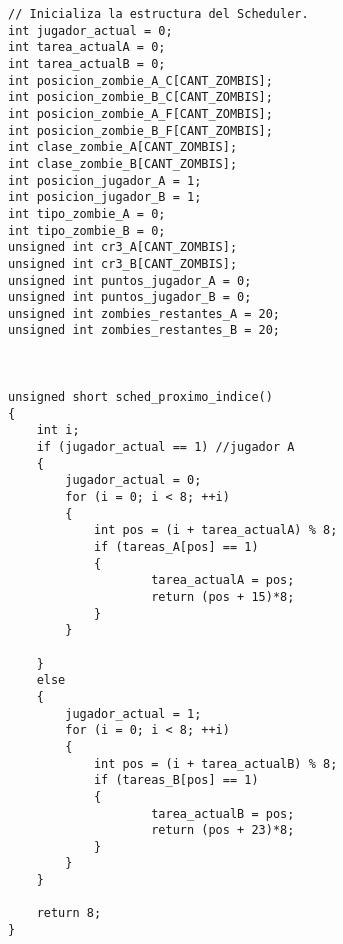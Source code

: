 \documentclass[a4paper]{article}
\begin{document}
\begin{lstlisting}[caption={Código del scheduler que determina qué tarea se debe ejecutar a continuación y prepara el entorno para ello. Si hubo un syscall fuerza el cambio a la tarea \texttt{Idle}. Además de la función que inicializa el mismo y la interfaz que exporta el scheduler para realizar el cambio de tareas. -- \textbf{sched.c}}, label=sched]
// Inicializa la estructura del Scheduler. 
int jugador_actual = 0;
int tarea_actualA = 0;						
int tarea_actualB = 0;						
int posicion_zombie_A_C[CANT_ZOMBIS];		
int posicion_zombie_B_C[CANT_ZOMBIS];		
int posicion_zombie_A_F[CANT_ZOMBIS];		
int posicion_zombie_B_F[CANT_ZOMBIS];		
int clase_zombie_A[CANT_ZOMBIS];				
int clase_zombie_B[CANT_ZOMBIS];				
int posicion_jugador_A = 1;					
int posicion_jugador_B = 1;						
int tipo_zombie_A = 0;
int tipo_zombie_B = 0;
unsigned int cr3_A[CANT_ZOMBIS];
unsigned int cr3_B[CANT_ZOMBIS];
unsigned int puntos_jugador_A = 0;
unsigned int puntos_jugador_B = 0;
unsigned int zombies_restantes_A = 20;
unsigned int zombies_restantes_B = 20;



unsigned short sched_proximo_indice()
{
	int i;
	if (jugador_actual == 1) //jugador A
	{
		jugador_actual = 0;
		for (i = 0; i < 8; ++i)
		{
			int pos = (i + tarea_actualA) % 8;
			if (tareas_A[pos] == 1)
			{			
					tarea_actualA = pos;
					return (pos + 15)*8;
			}
		}
		
	}
	else
	{
		jugador_actual = 1;
		for (i = 0; i < 8; ++i)
		{
			int pos = (i + tarea_actualB) % 8;
			if (tareas_B[pos] == 1)
			{				
					tarea_actualB = pos;
					return (pos + 23)*8;
			}
		}
	}

	return 8;
}
\end{lstlisting}

\clearpage

\clearpage
\end{document}
